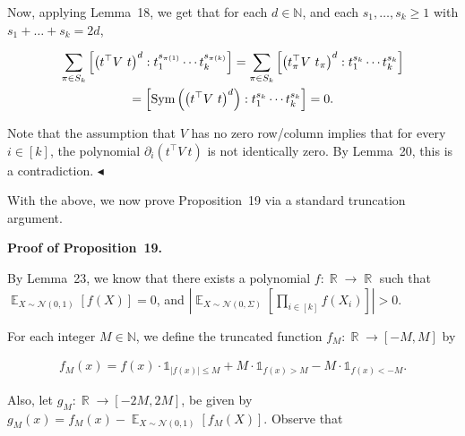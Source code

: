 \documentclass[10pt,a4paper]{article}
\begin{document}
Now, applying Lemma 18, we get that for each $d\in\mathbb{N}$, and each $s_{1},\dots,s_{k}\geqslant 1$ with $s_{1}+\dots+s_{k}=2d$,\par


\[\begin{gathered}
\displaystyle\sum_{\pi\in S_{k}}\left[\left(t^{\top}V\ t\right)^{d}:t_{1}^{s_{\pi(1)}}\cdots t_{k}^{s_{\pi(k)}}\right] \displaystyle=\sum_{\pi\in S_{k}}\left[\left(t_{\pi}^{\top}V\ t_{\pi}\right)^{d}:t_{1}^{s_{k}}\cdots t_{k}^{s_{k}}\right] \\
\displaystyle=\left[\textnormal{Sym}\left(\left(t^{\top}V\ t\right)^{d}\right):t_{1}^{s_{k}}\cdots t_{k}^{s_{k}}\right]=0.
\end{gathered}\]


Note that the assumption that $V$ has no zero row/column implies that for every $i\in[k]$, the polynomial $\partial_{i}\left(t^{\top}V\ t\right)$ is not identically zero.
By Lemma 20, this is a contradiction.
$\blacktriangleleft$\par




With the above, we now prove Proposition 19 via a standard truncation argument.\par





\par\medskip\noindent\textbf{Proof of Proposition 19.}\par




By Lemma 23, we know that there exists a polynomial $f:\mathop{\mathbb{R}}\to\mathop{\mathbb{R}}$ such that $\mathop{\mathbb{E}}_{X\sim\mathcal{N}(0,1)}\left[f(X)\right]=0$, and $\left|\mathop{\mathbb{E}}_{X\sim\mathcal{N}(0,\Sigma)}\left[\prod_{i\in[k]}f(X_{i})\right]\right|>0$.\par




For each integer $M\in\mathbb{N}$, we define the truncated function $f_{M}:\mathop{\mathbb{R}}\to[-M,M]$ by\par


\[\begin{gathered}
f_{M}(x)=f(x)\cdot\mathds{1}_{\left|f(x)\right|\leqslant M}+M\cdot\mathds{1}_{f(x)>M}-M\cdot\mathds{1}_{f(x)<-M}.
\end{gathered}\]


Also, let $g_{M}:\mathop{\mathbb{R}}\to[-2M,2M]$, be given by $g_{M}(x)=f_{M}(x)-\mathop{\mathbb{E}}_{X\sim\mathcal{N}(0,1)}\left[f_{M}(X)\right]$.
Observe that\par
\end{document}
